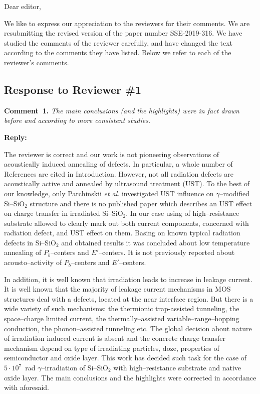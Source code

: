 \documentclass[aip,jap,preprint]{revtex4-1}
\begin{document}
Dear editor,

We like to express our appreciation to the reviewers for their comments.
We are resubmitting the revised version of the paper number  SSE-2019-316.
We have studied the comments of the reviewer carefully, and have changed the text according to the comments they
have listed.
Below we refer to each of the reviewer’s comments.



\subsection*{Response to Reviewer \#1 }

\noindent
\textcolor[rgb]{0.00,0.50,1.00}{\textbf{Comment~1.}}
\emph{The main conclusions (and the highlights) were in fact drawn before and according to more consistent studies.}

\noindent
\textcolor[rgb]{0.51,0.00,0.00}{\textbf{Reply:}}

The reviewer is correct and our work is not pioneering observations of acoustically induced annealing of defects.
In particular, a whole number of References are cited in Introduction.
However, not all radiation defects are acoustically active and annealed by ultrasound treatment (UST).
To the best of our knowledge, only Parchinskii \emph{et al}. \cite{Parchinskii2000,Parchinskii2006} investigated UST influence on
$\gamma$--modified Si--SiO$_2$ structure and there is no published paper which describes an UST effect on charge transfer in irradiated Si--SiO$_2$.
In our case using of high--resistance substrate allowed to clearly mark out both current components, concerned with radiation defect, and UST effect on them.
Basing on known typical radiation defects in Si--SiO$_2$ and obtained results it was concluded about low temperature annealing of $P_b$--centers and $E'$--centers.
It is not previously reported about acousto--activity of  $P_b$--centers and $E'$--centers.

In addition, it is well known that irradiation leads to increase in leakage current.
It is well known that the majority of leakage current mechanisms in MOS structures
deal with a defects, located at the near interface region.
But there is a wide variety of such mechanisms:
the thermionic trap-assisted tunneling,
the space--charge limited current,
the thermally--assisted variable--range--hopping conduction,
the phonon--assisted tunneling etc.
The global decision about nature of irradiation induced current is absent 
and the concrete charge transfer mechanism depend on type of irradiating particles, doze,  properties of semiconductor and oxide layer. 
This work has decided such task for the case of $5\cdot10^7$~rad $\gamma$--irradiation of Si--SiO$_2$ with high--resistance substrate and native oxide layer. 
The main conclusions and the highlights were corrected in accordance with aforesaid.
\end{document}
